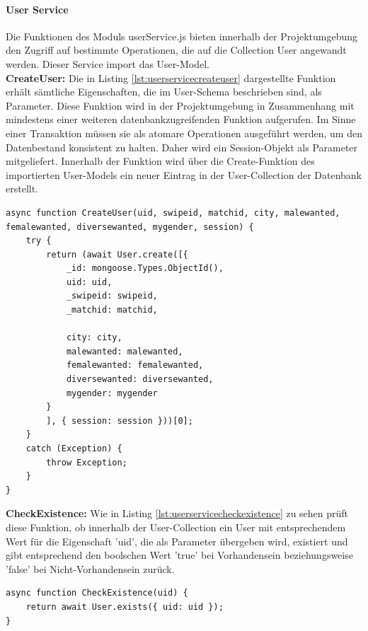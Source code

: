 %
%

\paragraph{User Service}
Die Funktionen des Moduls userService.js bieten innerhalb der Projektumgebung den Zugriff auf bestimmte Operationen, die auf die Collection User angewandt werden. Dieser Service import das User-Model.\\

\noindent
\textbf{CreateUser:}
Die in Listing \ref{lst:userservicecreateuser} dargestellte Funktion erhält sämtliche Eigenschaften, die im User-Schema beschrieben sind, als Parameter. Diese Funktion wird in der Projektumgebung in Zusammenhang mit mindestens einer weiteren datenbankzugreifenden Funktion aufgerufen. Im Sinne einer Transaktion müssen sie als atomare Operationen ausgeführt werden, um den Datenbestand konsistent zu halten. Daher wird ein Session-Objekt als Parameter mitgeliefert. Innerhalb der Funktion wird über die Create-Funktion des importierten User-Models ein neuer Eintrag in der User-Collection der Datenbank erstellt.

\begin{lstlisting}[caption=User Service - CreateUser, label=lst:userservicecreateuser]
async function CreateUser(uid, swipeid, matchid, city, malewanted, femalewanted, diversewanted, mygender, session) {
    try {
        return (await User.create([{
            _id: mongoose.Types.ObjectId(),
            uid: uid,
            _swipeid: swipeid,
            _matchid: matchid,

            city: city,
            malewanted: malewanted,
            femalewanted: femalewanted,
            diversewanted: diversewanted,
            mygender: mygender
        }
        ], { session: session }))[0];
    }
    catch (Exception) {
        throw Exception;
    }
}
\end{lstlisting}

\noindent
\textbf{CheckExistence:}
Wie in Listing \ref{lst:userservicecheckexistence} zu sehen prüft diese Funktion, ob innerhalb der User-Collection ein User mit entsprechendem Wert für die Eigenschaft 'uid', die als Parameter übergeben wird, existiert und gibt entsprechend den boolschen Wert 'true' bei Vorhandensein beziehungsweise 'false' bei Nicht-Vorhandensein zurück.\\

\begin{lstlisting}[caption=User Service - CheckExistence, label=lst:userservicecheckexistence]
async function CheckExistence(uid) {
    return await User.exists({ uid: uid });
}
\end{lstlisting}

